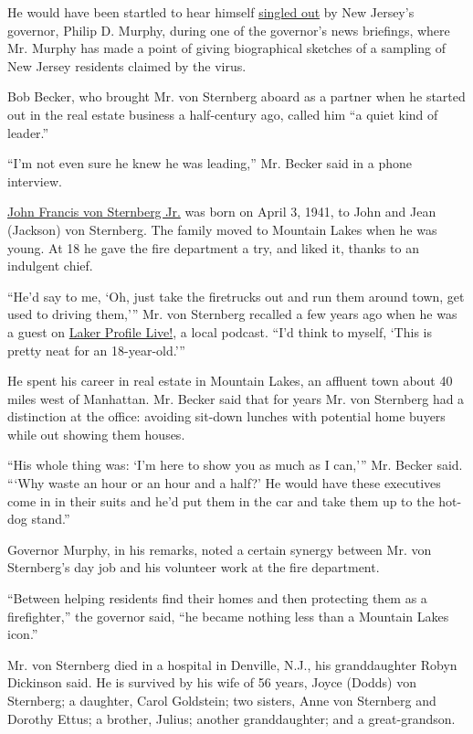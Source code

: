 He would have been startled to hear himself
\href{https://www.facebook.com/100001157507057/posts/2894874863894402/}{singled
out} by New Jersey's governor, Philip D. Murphy, during one of the
governor's news briefings, where Mr. Murphy has made a point of giving
biographical sketches of a sampling of New Jersey residents claimed by
the virus.

Bob Becker, who brought Mr. von Sternberg aboard as a partner when he
started out in the real estate business a half-century ago, called him
``a quiet kind of leader.''

``I'm not even sure he knew he was leading,'' Mr. Becker said in a phone
interview.

\href{https://obits.nj.com/obituaries/starledger/obituary.aspx?n=john-f-von-sternberg\&pid=196183514\&fhid=6054}{John
Francis von Sternberg Jr.} was born on April 3, 1941, to John and Jean
(Jackson) von Sternberg. The family moved to Mountain Lakes when he was
young. At 18 he gave the fire department a try, and liked it, thanks to
an indulgent chief.

``He'd say to me, `Oh, just take the firetrucks out and run them around
town, get used to driving them,''' Mr. von Sternberg recalled a few
years ago when he was a guest on
\href{https://mtnlakes.org/laker-profiles/john-von-sternberg/}{Laker
Profile Live!}, a local podcast. ``I'd think to myself, `This is pretty
neat for an 18-year-old.'''

He spent his career in real estate in Mountain Lakes, an affluent town
about 40 miles west of Manhattan. Mr. Becker said that for years Mr. von
Sternberg had a distinction at the office: avoiding sit-down lunches
with potential home buyers while out showing them houses.

``His whole thing was: `I'm here to show you as much as I can,''' Mr.
Becker said. ```Why waste an hour or an hour and a half?' He would have
these executives come in in their suits and he'd put them in the car and
take them up to the hot-dog stand.''

Governor Murphy, in his remarks, noted a certain synergy between Mr. von
Sternberg's day job and his volunteer work at the fire department.

``Between helping residents find their homes and then protecting them as
a firefighter,'' the governor said, ``he became nothing less than a
Mountain Lakes icon.''

Mr. von Sternberg died in a hospital in Denville, N.J., his
granddaughter Robyn Dickinson said. He is survived by his wife of 56
years, Joyce (Dodds) von Sternberg; a daughter, Carol Goldstein; two
sisters, Anne von Sternberg and Dorothy Ettus; a brother, Julius;
another granddaughter; and a great-grandson.

